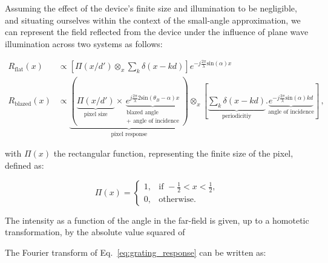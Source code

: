 \documentclass[12pt]{iopart}
\begin{document}
\begin{optional}
  Assuming the effect of the device's finite size and illumination to be negligible,
  and situating ourselves within the context of the small-angle approximation,
  we can represent the field reflected from the device
  under the influence of plane wave illumination
  across two systems as follows:


  \begin{equation}
    \begin{aligned}
      R_\text{flat}(x)   & \propto \left[\Pi\left(x/d'\right) \otimes_x \sum_k \delta(x-k d)\right]e^{-j\frac{2\pi}{\lambda}\text{sin}(\alpha) x} \\
      R_\text{blazed}(x) & \propto
      \underbrace{
        \left(
        \underbrace{\Pi\left(x/d'\right)}_\text{pixel size}
        \times
      \underbrace{e^{j\frac{2\pi}{\lambda}2\text{sin}(\theta_B-\alpha) x}}_{\substack{\text{blazed angle}                                         \\ \text{+ angle of incidence}}}
        \right)
      }_\text{pixel response}
      \otimes_x
      \left[
        \underbrace{\sum_k \delta(x-k d) }_\text{periodicitiy}
        .
        \underbrace{
          e^{-j\frac{2\pi}{\lambda}\text{sin}(\alpha) kd}
        }_\text{angle of incidence}
        \right]
      \, ,
    \end{aligned}
    \label{eq:grating_response}
  \end{equation}

  with $\Pi(x)$ the rectangular function,
  representing the finite size of the pixel,
  defined as:

  \begin{equation}
    \Pi(x) =
    \begin{cases}
      1, & \text{if } -\frac{1}{2} < x < \frac{1}{2}, \\
      0, & \text{otherwise}.
    \end{cases}
  \end{equation}

  The intensity as a function of the angle in the far-field
  is given, up to a homotetic transformation,
  by the absolute value squared of

  The Fourier transform of Eq.~\ref{eq:grating_response} can be written as:







\end{optional}
\end{document}
